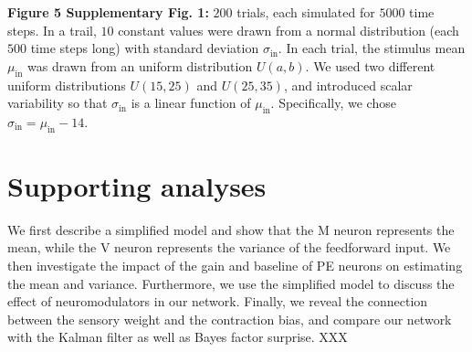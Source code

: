 \documentclass[10pt,a4paper,draft]{article}
\begin{document}
%
\textbf{Figure 5 Supplementary Fig. 1:} $200$ trials, each simulated for $5000$ time steps. In a trail, $10$ constant values were drawn from a normal distribution (each $500$ time steps long) with standard deviation $\sigma_\mathrm{in}$. In each trial, the stimulus mean $\mu_\mathrm{in}$ was drawn from an uniform distribution $U(a,b)$. We used two different uniform distributions $U(15, 25)$ and  $U(25, 35)$, and introduced scalar variability so that $\sigma_\mathrm{in}$ is a linear function of $\mu_\mathrm{in}$. Specifically, we chose $\sigma_\mathrm{in} = \mu_\mathrm{in} -14$.


\section{Supporting analyses}

We first describe a simplified model and show that the M neuron represents the mean, while the V neuron represents the variance of the feedforward input. We then investigate the impact of the gain and baseline of PE neurons on estimating the mean and variance. Furthermore, we use the simplified model to discuss the effect of neuromodulators in our network. Finally, we reveal the connection between the sensory weight and the contraction bias, and compare our network with the Kalman filter as well as Bayes factor surprise. XXX
\end{document}
